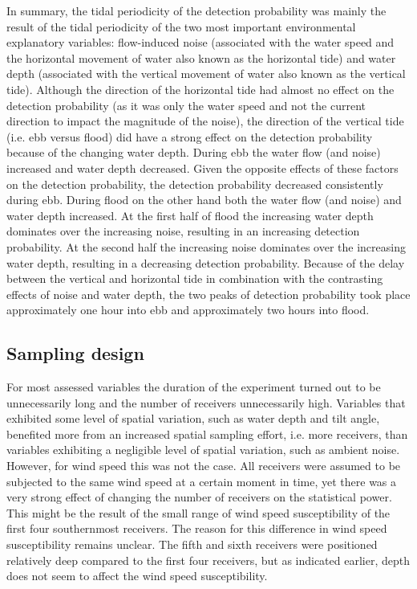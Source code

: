 \documentclass[doublespacing,linenumbers]{bmcart}
\begin{document}
In summary, the tidal periodicity of the detection probability was mainly the result of the tidal periodicity of the two most important environmental explanatory variables: flow-induced noise (associated with the water speed and the horizontal movement of water also known as the horizontal tide) and water depth (associated with the vertical movement of water also known as the vertical tide). Although the direction of the horizontal tide had almost no effect on the detection probability (as it was only the water speed and not the current direction to impact the magnitude of the noise), the direction of the vertical tide (i.e. ebb versus flood) did have a strong effect on the detection probability because of the changing water depth. During ebb the water flow (and noise) increased and water depth decreased. Given the opposite effects of these factors on the detection probability, the detection probability decreased consistently during ebb. During flood on the other hand both the water flow (and noise) and water depth increased. At the first half of flood the increasing water depth dominates over the increasing noise, resulting in an increasing detection probability. At the second half the increasing noise dominates over the increasing water depth, resulting in a decreasing detection probability. Because of the delay between the vertical and horizontal tide in combination with the contrasting effects of noise and water depth, the two peaks of detection probability took place approximately one hour into ebb and approximately two hours into flood. 

\subsection*{Sampling design}

For most assessed variables the duration of the experiment turned out to be unnecessarily long and the number of receivers unnecessarily high. Variables that exhibited some level of spatial variation, such as water depth and tilt angle, benefited more from an increased spatial sampling effort, i.e. more receivers, than variables exhibiting a negligible level of spatial variation, such as ambient noise. However, for wind speed this was not the case. All receivers were assumed to be subjected to the same wind speed at a certain moment in time, yet there was a very strong effect of changing the number of receivers on the statistical power. This might be the result of the small range of wind speed susceptibility of the first four southernmost receivers. The reason for this difference in wind speed susceptibility remains unclear. The fifth and sixth receivers were positioned relatively deep compared to the first four receivers, but as indicated earlier, depth does not seem to affect the wind speed susceptibility.
\end{document}
